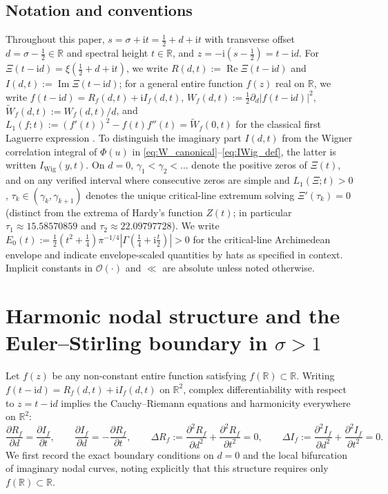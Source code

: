 \documentclass[11pt,a4paper,reqno]{amsart}
\theoremstyle{definition}
\theoremstyle{remark}
\numberwithin{equation}{section}
\newcommand{\ii}{\mathrm{i}}
\newcommand{\Rea}{\operatorname{Re}}
\newcommand{\Ima}{\operatorname{Im}}
\newcommand{\Wtil}{\widetilde{W}}
\begin{document}
\subsection{Notation and conventions}\label{subsec:notation}

Throughout this paper, $s = \sigma + \ii t = \frac{1}{2} + d + \ii t$ with transverse offset $d = \sigma - \frac{1}{2} \in \mathbb{R}$ and spectral height $t \in \mathbb{R}$, and $z = -\ii(s-\frac{1}{2}) = t - \ii d$. For $\Xi(t-\ii d) = \xi(\frac{1}{2}+d+\ii t)$, we write $R(d,t) := \Rea\Xi(t-\ii d)$ and $I(d,t) := \Ima\Xi(t-\ii d)$; for a general entire function $f(z)$ real on $\mathbb{R}$, we write $f(t-\ii d) = R_f(d,t) + \ii I_f(d,t)$, $W_f(d,t) := \frac{1}{2}\partial_d|f(t-\ii d)|^2$, $\Wtil_f(d,t) := W_f(d,t)/d$, and $L_1(f;t) := (f'(t))^2 - f(t)f''(t) = \Wtil_f(0,t)$ for the classical first Laguerre expression \cite{Jensen1913,CsordasVarga1990}. To distinguish the imaginary part $I(d,t)$ from the Wigner correlation integral of $\Phi(u)$ in \eqref{eq:W_canonical}--\eqref{eq:IWig_def}, the latter is written $I_{\mathrm{Wig}}(y,t)$. On $d = 0$, $\gamma_1 < \gamma_2 < \dots$ denote the positive zeros of $\Xi(t)$, and on any verified interval where consecutive zeros are simple and $L_1(\Xi;t) > 0$, $\tau_k \in (\gamma_k, \gamma_{k+1})$ denotes the unique critical-line extremum solving $\Xi'(\tau_k) = 0$ (distinct from the extrema of Hardy's function $Z(t)$; in particular $\tau_1 \approx 15.58570859$ and $\tau_2 \approx 22.09797728$). We write $E_0(t) := \frac{1}{2}(t^2+\frac{1}{4})\pi^{-1/4}|\Gamma(\frac{1}{4}+\ii\frac{t}{2})| > 0$ for the critical-line Archimedean envelope and indicate envelope-scaled quantities by hats as specified in context. Implicit constants in $\mathcal{O}(\cdot)$ and $\ll$ are absolute unless noted otherwise.

\section{Harmonic nodal structure and the Euler--Stirling boundary in \texorpdfstring{$\sigma > 1$}{sigma > 1}}\label{sec:chambers}

Let $f(z)$ be any non-constant entire function satisfying $f(\mathbb{R}) \subset \mathbb{R}$. Writing $f(t-\ii d) = R_f(d,t) + \ii I_f(d,t)$ on $\mathbb{R}^2$, complex differentiability with respect to $z = t - \ii d$ implies the Cauchy--Riemann equations and harmonicity everywhere on $\mathbb{R}^2$:
\begin{equation}\label{eq:cr_laplace}
\frac{\partial R_f}{\partial d} = \frac{\partial I_f}{\partial t}, \qquad
\frac{\partial I_f}{\partial d} = -\frac{\partial R_f}{\partial t}, \qquad
\Delta R_f := \frac{\partial^2 R_f}{\partial d^2} + \frac{\partial^2 R_f}{\partial t^2} = 0, \qquad
\Delta I_f := \frac{\partial^2 I_f}{\partial d^2} + \frac{\partial^2 I_f}{\partial t^2} = 0.
\end{equation}
We first record the exact boundary conditions on $d = 0$ and the local bifurcation of imaginary nodal curves, noting explicitly that this structure requires only $f(\mathbb{R}) \subset \mathbb{R}$.
\end{document}
